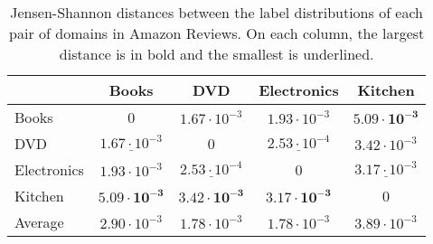 \begin{table}
	\centering
	\caption{Jensen-Shannon distances between the label distributions of each pair of domains in Amazon Reviews. On each column, the largest distance is in bold and the smallest is underlined.}
	\small
	\begin{tabular}{l|cccc}
		& Books                & DVD                  & Electronics          & Kitchen              \\ \hline
		Books       & 0                    & $1.67 \cdot 10^{-3}$ & $1.93 \cdot 10^{-3}$ & $\boldsymbol{5.09 \cdot 10^{-3}}$ \\
		DVD         & $\underline{1.67 \cdot 10^{-3}}$ & 0                    & $\underline{2.53 \cdot 10^{-4}}$ & $3.42 \cdot 10^{-3}$ \\
		Electronics & $1.93 \cdot 10^{-3}$ & $\underline{2.53 \cdot 10^{-4}}$ & 0                    & $\underline{3.17 \cdot 10^{-3}}$ \\
		Kitchen     & $\boldsymbol{5.09 \cdot 10^{-3}}$ & $\boldsymbol{3.42 \cdot 10^{-3}}$ & $\boldsymbol{3.17 \cdot 10^{-3}}$ & 0 \\ \hline
		Average & $2.90 \cdot 10^{-3}$ & $1.78 \cdot 10^{-3}$ & $1.78 \cdot 10^{-3}$ & $3.89 \cdot 10^{-3}$
	\end{tabular}
	\label{tab:amazon_js}
\end{table}

